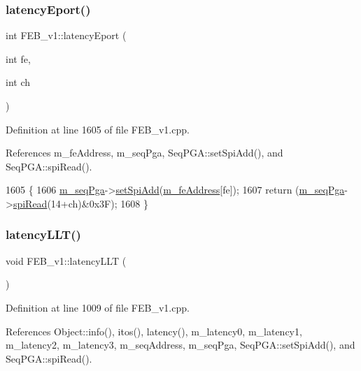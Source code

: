 \subsubsection{\texorpdfstring{latency\+Eport()}{latencyEport()}\hspace{0.1cm}{\footnotesize\ttfamily [2/2]}}
{\footnotesize\ttfamily int F\+E\+B\+\_\+v1\+::latency\+Eport (\begin{DoxyParamCaption}\item[{int}]{fe,  }\item[{int}]{ch }\end{DoxyParamCaption})}



Definition at line 1605 of file F\+E\+B\+\_\+v1.\+cpp.



References m\+\_\+fe\+Address, m\+\_\+seq\+Pga, Seq\+P\+G\+A\+::set\+Spi\+Add(), and Seq\+P\+G\+A\+::spi\+Read().


\begin{DoxyCode}
1605                                        \{
1606   \hyperlink{classFEB__v1_a6c7804ac86796f233a8393043adf2e77}{m\_seqPga}->\hyperlink{classSeqPGA_ac998ce3a6d9b5f2e88cc8393f8c1df53}{setSpiAdd}(\hyperlink{classFEB__v1_a4e1945c2d5b434125f375e9d0fc6d99f}{m\_feAddress}[fe]);
1607   \textcolor{keywordflow}{return} (\hyperlink{classFEB__v1_a6c7804ac86796f233a8393043adf2e77}{m\_seqPga}->\hyperlink{classSeqPGA_ab3d0e5e5d4014bc7a92588a76b8713d4}{spiRead}(14+ch)&0x3F);
1608 \}
\end{DoxyCode}
\mbox{\label{classFEB__v1_a42cc3f61fd94d4de68eb605b04fb1e74}} 
\subsubsection{\texorpdfstring{latency\+L\+L\+T()}{latencyLLT()}}
{\footnotesize\ttfamily void F\+E\+B\+\_\+v1\+::latency\+L\+LT (\begin{DoxyParamCaption}{ }\end{DoxyParamCaption})}



Definition at line 1009 of file F\+E\+B\+\_\+v1.\+cpp.



References Object\+::info(), itos(), latency(), m\+\_\+latency0, m\+\_\+latency1, m\+\_\+latency2, m\+\_\+latency3, m\+\_\+seq\+Address, m\+\_\+seq\+Pga, Seq\+P\+G\+A\+::set\+Spi\+Add(), and Seq\+P\+G\+A\+::spi\+Read().



